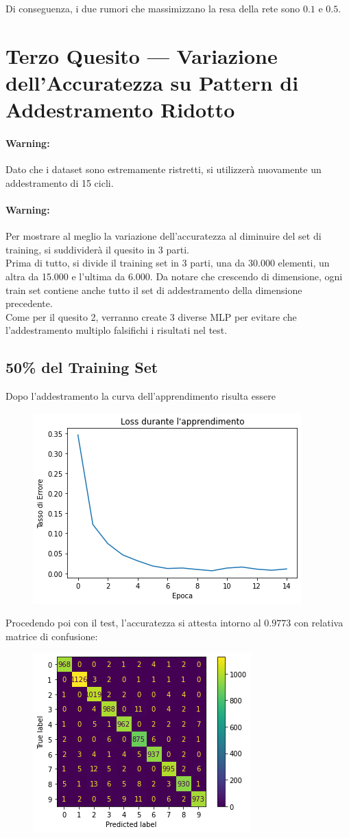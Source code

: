 \documentclass[12pt, a4paper]{article}
\begin{document}
Di conseguenza, i due rumori che massimizzano la resa della rete sono \(0.1\) e \(0.5\).

\newpage
\section{Terzo Quesito --- Variazione dell'Accuratezza su Pattern di Addestramento Ridotto}
\paragraph{Warning: }Dato che i dataset sono estremamente ristretti, si utilizzerà nuovamente un addestramento di 15 cicli.
\paragraph{Warning: }Per mostrare al meglio la variazione dell'accuratezza al diminuire del set di training, si suddividerà il quesito in 3 parti.
\\
Prima di tutto, si divide il training set in 3 parti, una da 30.000 elementi, un altra da 15.000 e l'ultima da 6.000. Da notare che crescendo di dimensione, ogni train set contiene anche tutto il set di addestramento della dimensione precedente. \\
Come per il quesito 2, verranno create 3 diverse MLP per evitare che l'addestramento multiplo falsifichi i risultati nel test.
\subsection{50\% del Training Set}
Dopo l'addestramento la curva dell'apprendimento risulta essere
\begin{figure}[H]
    \centering
    \includegraphics[width=.5\textwidth]{Set50.png}
\end{figure}

Procedendo poi con il test, l'accuratezza si attesta intorno al \(0.9773\) con relativa matrice di confusione:
\begin{figure}[H]
    \centering
    \includegraphics[width=.5\textwidth]{Matrix50.png}
\end{figure}
\end{document}

